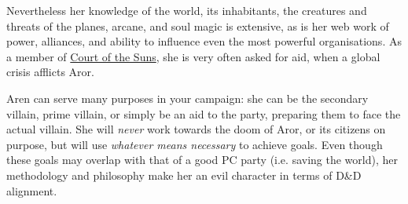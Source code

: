 Nevertheless her knowledge of the world, its inhabitants, the creatures and
threats of the planes, arcane, and soul magic is extensive, as is her web work
of power, alliances, and ability to influence even the most powerful
organisations. As a member of \hyperref[sec:Two Courts]{Court of the Suns},
she is very often asked for aid, when a global crisis afflicts Aror.

\begin{note}
  Aren can serve many purposes in your campaign: she can be the secondary
  villain, prime villain, or simply be an aid to the party, preparing them
  to face the actual villain. She will \emph{never} work towards the doom of
  Aror, or its citizens on purpose, but will use \emph{whatever means
    necessary} to achieve goals. Even though these goals may overlap with
  that of a good PC party (i.e. saving the world), her methodology and
  philosophy make her an evil character in terms of D\&D alignment.
\end{note}
